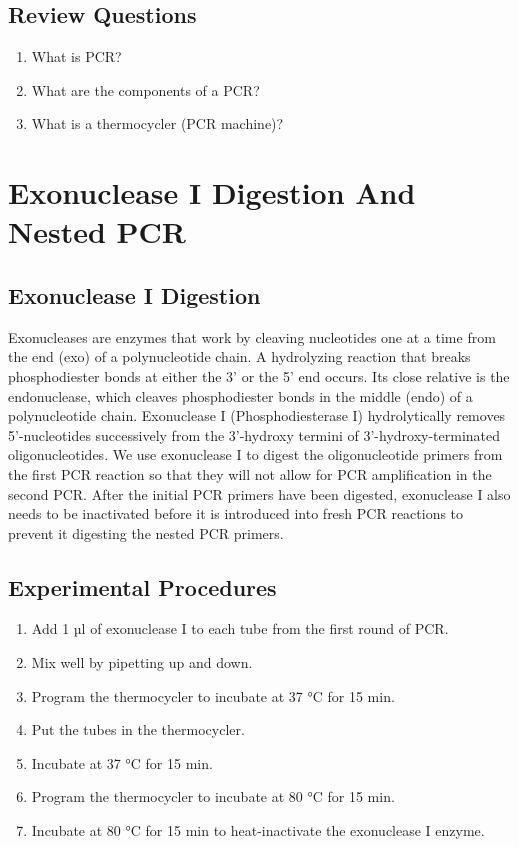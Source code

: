 \documentclass[]{book}
\providecommand{\tightlist}{%
  \setlength{\itemsep}{0pt}\setlength{\parskip}{0pt}}
\begin{document}
\section{Review Questions}\label{review-questions-5}

\begin{enumerate}
\def\labelenumi{\arabic{enumi}.}
\tightlist
\item
  What is PCR?
\item
  What are the components of a PCR?
\item
  What is a thermocycler (PCR machine)?
\end{enumerate}

\chapter{Exonuclease I Digestion And Nested
PCR}\label{exonuclease-i-digestion-and-nested-pcr}

\section{Exonuclease I Digestion}\label{exonuclease-i-digestion}

Exonucleases are enzymes that work by cleaving nucleotides one at a time
from the end (exo) of a polynucleotide chain. A hydrolyzing reaction
that breaks phosphodiester bonds at either the 3' or the 5' end occurs.
Its close relative is the endonuclease, which cleaves phosphodiester
bonds in the middle (endo) of a polynucleotide chain. Exonuclease I
(Phosphodiesterase I) hydrolytically removes 5'-nucleotides successively
from the 3'-hydroxy termini of 3'-hydroxy-terminated oligonucleotides.
We use exonuclease I to digest the oligonucleotide primers from the
first PCR reaction so that they will not allow for PCR amplification in
the second PCR. After the initial PCR primers have been digested,
exonuclease I also needs to be inactivated before it is introduced into
fresh PCR reactions to prevent it digesting the nested PCR primers.

\section{Experimental Procedures}\label{experimental-procedures-10}

\begin{enumerate}
\def\labelenumi{\arabic{enumi}.}
\tightlist
\item
  Add 1 µl of exonuclease I to each tube from the first round of PCR.
\item
  Mix well by pipetting up and down.
\item
  Program the thermocycler to incubate at 37 °C for 15 min.
\item
  Put the tubes in the thermocycler.
\item
  Incubate at 37 °C for 15 min.
\item
  Program the thermocycler to incubate at 80 °C for 15 min.
\item
  Incubate at 80 °C for 15 min to heat-inactivate the exonuclease I
  enzyme.
\end{enumerate}
\end{document}
